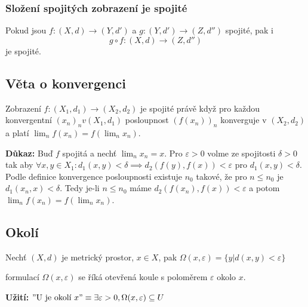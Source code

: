 \documentclass[../main.tex]{subfiles}
\begin{document}
\subsubsection{Složení spojitých zobrazení je spojité}

\hspace{1.2mm}
Pokud jsou $f: (X,d) \to (Y, d')$ a $g: (Y,d') \to (Z, d'')$ spojité, pak i
\[ g \circ f: (X,d) \to (Z,d'') \] je spojité.

\subsection{Věta o konvergenci}
\hspace{1.2mm}
Zobrazení $f: (X_1,d_1) \rightarrow (X_2,d_2)$ je spojité právě když pro každou konvergentní $(x_n)_n v (X_1,d_1)$ 
posloupnost $(f(x_n))_n$ konverguje v $(X_2,d_2)$ a platí $\lim_n f(x_n) = f(\lim_n x_n)$.

\noindent
\hspace{1.2mm}
\textbf{Důkaz:}
Buď $f$ spojitá a nechť $\lim_nx_n = x$. Pro $\varepsilon > 0$ volme ze spojitosti $\delta > 0$
tak aby $\forall x,y \in X_1 : d_1(x,y) <\delta \implies d_2(f(y),f(x)) <\varepsilon$ pro $d_1(x,y) < \delta$.
Podle definice konvergence posloupnosti existuje $n_0$ takové, že pro $n\leq n_0$ je $d_1(x_n,x) < \delta$. Tedy je-li $n \leq n_0$
máme $d_2(f(x_n),f(x)) < \varepsilon$ a potom $\lim_n f(x_n) = f(\lim_n x_n)$.


\subsection{Okolí}
\hspace{1.2mm}
Nechť $(X,d)$ je metrický prostor, $x\in X$, pak
$\Omega (x,\varepsilon) = \{ y | d(x,y) < \varepsilon \}$

formulací $\Omega (x,\varepsilon)$ se říká otevřená koule s poloměrem $\varepsilon$ okolo $x$.
\vspace{5mm}

\noindent
\hspace{1.2mm}
\textbf{Užití:}
$"\textrm{U je okolí } x" \equiv \exists \varepsilon > 0, \Omega (x,\varepsilon) \subseteq U $

\end{document}
